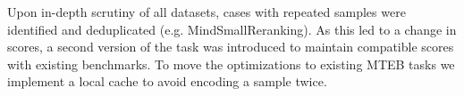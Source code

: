 Upon in-depth scrutiny of all datasets, cases with repeated samples were identified and deduplicated (e.g. MindSmallReranking). As this led to a change in scores, a second version of the task was introduced to maintain compatible scores with existing benchmarks. To move the optimizations to existing MTEB tasks we implement a local cache to avoid encoding a sample twice.